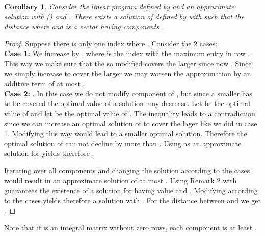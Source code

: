 \documentclass[a4paper,11pt]{article}
\newtheorem{cor}[thm]{Corollary}
\begin{document}
\begin{cor}
 Consider the linear program  defined by  and an approximate solution  with  () and . There exists a solution
   of  defined by  with  such that the distance 
  where  and  is a vector having components .
\end{cor}
\begin{proof}
	Suppose there is only one index  where . Consider the 2 cases:\\
	{\bf Case 1:}  We increase  by , where  is the index with the maximum entry in row .
	This way we make sure that the so modified  covers the larger  since now .
	Since we simply increase  to cover the larger  we may worsen the approximation by an additive term of
	at most .\\
	{\bf Case 2:} . In this case we do not modify component  of , but since a smaller  has to
	be covered the optimal value of a solution may decrease. 
	Let  be the optimal value of  and let  be the optimal value of .
	The inequality  leads to a contradiction since
	we can increase an optimal solution  of  to cover the lager  like 
	we did in case 1. Modifying 
	 this way would lead to a smaller optimal solution.
	Therefore the optimal solution of  can not decline by more than .
	Using  as an approximate solution for  yields therefore .
	
	Iterating over all components  and changing the solution according to the cases would result 
	in an approximate solution of at most
	.
	Using Remark 2 with 
	guarantees the existence of a solution  for  having value  and 
	.
	Modifying  according to the cases yields therefore a solution  with . For the distance between  and  we get .
\end{proof}
Note that if  is an integral matrix without zero rows, each component  is at least .
\end{document}
